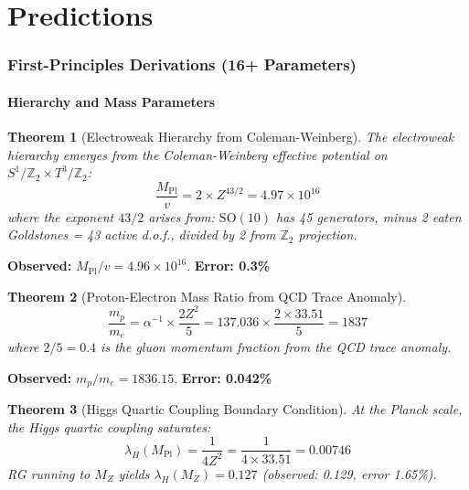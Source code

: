 \documentclass[11pt,a4paper]{article}
\theoremstyle{plain}
\newtheorem{theorem}{Theorem}[section]
\theoremstyle{definition}
\theoremstyle{remark}
\newcommand{\Mpl}{M_{\text{Pl}}}
\newcommand{\MZ}{M_Z}
\newcommand{\Tthree}{T^3}
\newcommand{\Ztwo}{\mathbb{Z}_2}
\newcommand{\SOten}{\text{SO}(10)}
\begin{document}
\part{Predictions}

\section{First-Principles Derivations (16+ Parameters)}

\subsection{Hierarchy and Mass Parameters}

\begin{theorem}[Electroweak Hierarchy from Coleman-Weinberg]
The electroweak hierarchy emerges from the Coleman-Weinberg effective potential on $S^1/\Ztwo \times \Tthree/\Ztwo$:
\begin{equation}
\boxed{\frac{\Mpl}{v} = 2 \times Z^{43/2} = 4.97 \times 10^{16}}
\end{equation}
where the exponent $43/2$ arises from: $\SOten$ has 45 generators, minus 2 eaten Goldstones = 43 active d.o.f., divided by 2 from $\Ztwo$ projection.
\end{theorem}

\textbf{Observed:} $\Mpl/v = 4.96 \times 10^{16}$. \textbf{Error: 0.3\%}

\begin{theorem}[Proton-Electron Mass Ratio from QCD Trace Anomaly]
\begin{equation}
\boxed{\frac{m_p}{m_e} = \alpha^{-1} \times \frac{2Z^2}{5} = 137.036 \times \frac{2 \times 33.51}{5} = 1837}
\end{equation}
where $2/5 = 0.4$ is the gluon momentum fraction from the QCD trace anomaly.
\end{theorem}

\textbf{Observed:} $m_p/m_e = 1836.15$. \textbf{Error: 0.042\%}

\begin{theorem}[Higgs Quartic Coupling Boundary Condition]
At the Planck scale, the Higgs quartic coupling saturates:
\begin{equation}
\boxed{\lambda_H(\Mpl) = \frac{1}{4Z^2} = \frac{1}{4 \times 33.51} = 0.00746}
\end{equation}
RG running to $\MZ$ yields $\lambda_H(\MZ) = 0.127$ (observed: 0.129, error 1.65\%).
\end{theorem}
\end{document}
